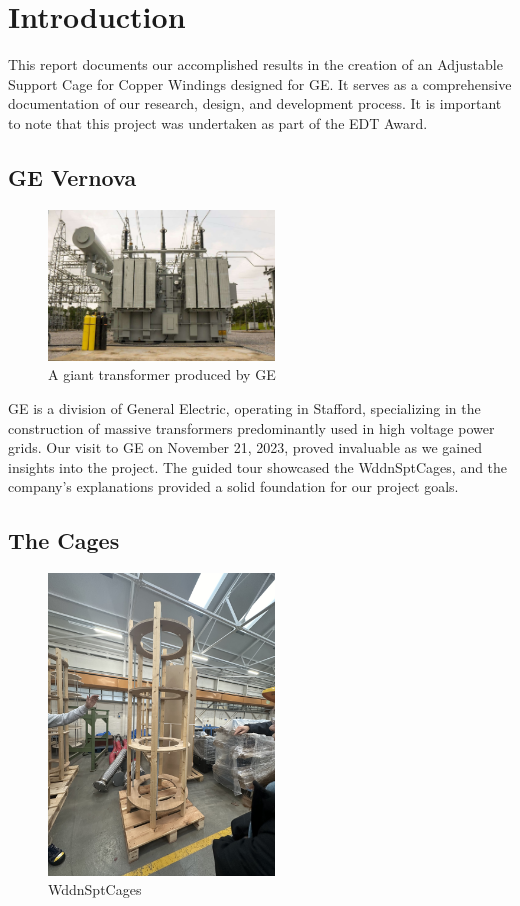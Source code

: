\documentclass[a4paper,10pt]{article}
\begin{document}
\section{Introduction}
This report documents our accomplished results in the creation of an Adjustable Support Cage for Copper Windings designed for \gls{GE}. It serves as a comprehensive documentation of our research, design, and development process. It is important to note that this project was undertaken as part of the \gls{EDT} Award.

\subsection{GE Vernova}
\begin{figure}[H]
  \centering
  \includegraphics[width=6cm]{giant-transformer}
  \caption{A giant transformer produced by \gls{GE}}
  \label{fig:giant-transformer}
\end{figure}

\gls{GE} is a division of General Electric, operating in Stafford, specializing in the construction of massive transformers predominantly used in high voltage power grids. Our visit to \gls{GE} on November 21, 2023, proved invaluable as we gained insights into the project. The guided tour showcased the \gls{WddnSptCages}, and the company's explanations provided a solid foundation for our project goals.

\subsection{The Cages}
\begin{figure}[H]
  \centering
  \includegraphics[width=6cm, angle=270]{wooden-support-cage}
  \caption{\gls{WddnSptCages}}
  \label{fig:wooden-support-cage}
\end{figure}
\end{document}
